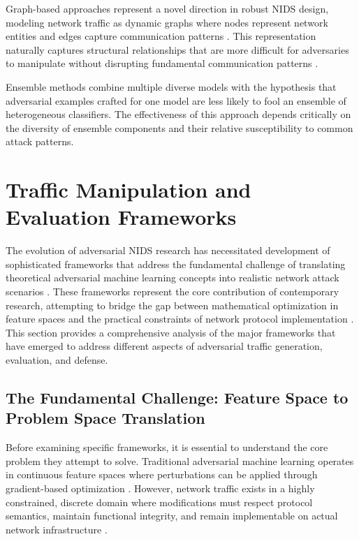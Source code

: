 Graph-based approaches represent a novel direction in robust NIDS design, modeling network traffic as dynamic graphs where nodes represent network entities and edges capture communication patterns \cite{gnn2023ids}. This representation naturally captures structural relationships that are more difficult for adversaries to manipulate without disrupting fundamental communication patterns \cite{graph2023neural}.

Ensemble methods combine multiple diverse models with the hypothesis that adversarial examples crafted for one model are less likely to fool an ensemble of heterogeneous classifiers. The effectiveness of this approach depends critically on the diversity of ensemble components and their relative susceptibility to common attack patterns.

\section{Traffic Manipulation and Evaluation Frameworks}
\label{sec:manipulation_frameworks}

The evolution of adversarial NIDS research has necessitated development of sophisticated frameworks that address the fundamental challenge of translating theoretical adversarial machine learning concepts into realistic network attack scenarios \cite{he2023adversarial}. These frameworks represent the core contribution of contemporary research, attempting to bridge the gap between mathematical optimization in feature spaces and the practical constraints of network protocol implementation \cite{merzouk2022investigating, vitorino2025reliable}. This section provides a comprehensive analysis of the major frameworks that have emerged to address different aspects of adversarial traffic generation, evaluation, and defense.

\subsection{The Fundamental Challenge: Feature Space to Problem Space Translation}

Before examining specific frameworks, it is essential to understand the core problem they attempt to solve. Traditional adversarial machine learning operates in continuous feature spaces where perturbations can be applied through gradient-based optimization \cite{han2021evaluating}. However, network traffic exists in a highly constrained, discrete domain where modifications must respect protocol semantics, maintain functional integrity, and remain implementable on actual network infrastructure \cite{he2023adversarial, vitorino2023sok}.

